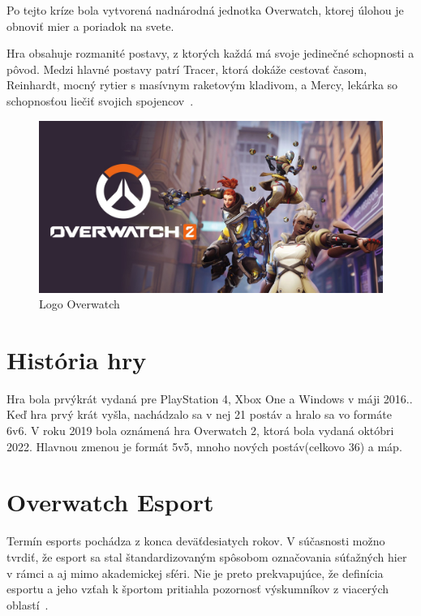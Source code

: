 \documentclass[10pt,oneside,slovak,a4paper]{article}
\begin{document}
Po tejto kríze bola vytvorená nadnárodná jednotka Overwatch, ktorej úlohou je obnoviť mier a poriadok na svete.

Hra obsahuje rozmanité postavy, z ktorých každá má svoje jedinečné schopnosti a pôvod. Medzi hlavné postavy patrí Tracer, ktorá dokáže cestovať časom, Reinhardt, mocný rytier s masívnym raketovým kladivom, a Mercy, lekárka so schopnosťou liečiť svojich spojencov~\cite{Overwatchanalysis}. 

\begin{figure}[h!]
\includegraphics[scale=0.2]{images/overwatch_title_image.jpg}
\caption{Logo Overwatch}
\end{figure}

\newpage
\section{História hry} \label{História hry}

Hra bola prvýkrát vydaná pre PlayStation 4, Xbox One a Windows v máji 2016.. Keď hra prvý krát vyšla, nachádzalo sa v nej 21 postáv a hralo sa vo formáte 6v6. V roku 2019 bola oznámená hra Overwatch 2, ktorá bola vydaná októbri 2022. Hlavnou zmenou je formát 5v5, mnoho nových postáv(celkovo 36) a máp.


\section{Overwatch Esport} \label{Overwatch Esport}

Termín esports pochádza z konca deväťdesiatych rokov. V súčasnosti možno tvrdiť, že esport sa stal štandardizovaným spôsobom označovania súťažných hier v rámci a aj mimo akademickej sféri. Nie je preto prekvapujúce, že definícia esportu a jeho vzťah k športom pritiahla pozornosť výskumníkov z viacerých oblastí~\cite{Overwatchesport}.
\end{document}
